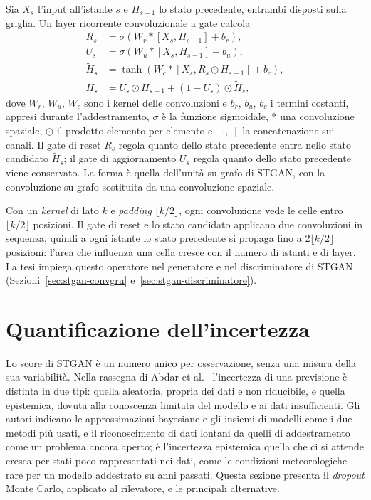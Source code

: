 Sia $X_s$ l'input all'istante $s$ e $H_{s-1}$ lo stato precedente, entrambi disposti sulla griglia. Un layer ricorrente convoluzionale a gate calcola
\begin{align}
    R_s &= \sigma\!\left(W_r * [X_s,H_{s-1}]+b_r\right), \label{eq:convgru-reset}\\
    U_s &= \sigma\!\left(W_u * [X_s,H_{s-1}]+b_u\right),\\
    \widetilde{H}_s &= \tanh\!\left(W_c * [X_s,R_s\odot H_{s-1}]+b_c\right),\\
    H_s &= U_s\odot H_{s-1}+(1-U_s)\odot\widetilde{H}_s, \label{eq:convgru-stato}
\end{align}
dove $W_r$, $W_u$, $W_c$ sono i kernel delle convoluzioni e $b_r$, $b_u$, $b_c$ i termini costanti, appresi durante l'addestramento, $\sigma$ è la funzione sigmoidale, $*$ una convoluzione spaziale, $\odot$ il prodotto elemento per elemento e $[\cdot,\cdot]$ la concatenazione sui canali. Il gate di reset $R_s$ regola quanto dello stato precedente entra nello stato candidato $\widetilde{H}_s$; il gate di aggiornamento $U_s$ regola quanto dello stato precedente viene conservato. La forma è quella dell'unità su grafo di STGAN, con la convoluzione su grafo sostituita da una convoluzione spaziale.

Con un \emph{kernel} di lato $k$ e \emph{padding} $\lfloor k/2\rfloor$, ogni convoluzione vede le celle entro $\lfloor k/2\rfloor$ posizioni. Il gate di reset e lo stato candidato applicano due convoluzioni in sequenza, quindi a ogni istante lo stato precedente si propaga fino a $2\lfloor k/2\rfloor$ posizioni: l'area che influenza una cella cresce con il numero di istanti e di layer. La tesi impiega questo operatore nel generatore e nel discriminatore di STGAN (Sezioni~\ref{sec:stgan-convgru} e~\ref{sec:stgan-discriminatore}).

\section{Quantificazione dell'incertezza}
\label{sec:rw-sde}

Lo score di STGAN è un numero unico per osservazione, senza una misura della sua variabilità. Nella rassegna di Abdar et al.~\cite{abdar2021review} l'incertezza di una previsione è distinta in due tipi: quella aleatoria, propria dei dati e non riducibile, e quella epistemica, dovuta alla conoscenza limitata del modello e ai dati insufficienti. Gli autori indicano le approssimazioni bayesiane e gli insiemi di modelli come i due metodi più usati, e il riconoscimento di dati lontani da quelli di addestramento come un problema ancora aperto; è l'incertezza epistemica quella che ci si attende cresca per stati poco rappresentati nei dati, come le condizioni meteorologiche rare per un modello addestrato su anni passati. Questa sezione presenta il \emph{dropout} Monte Carlo, applicato al rilevatore, e le principali alternative.

